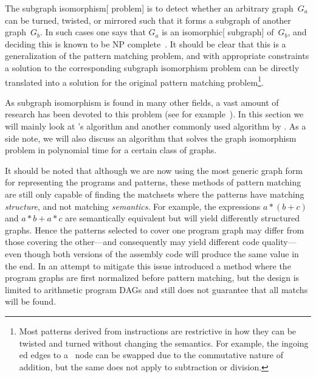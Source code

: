 The \gls{subgraph isomorphism}[ problem] is to detect whether an arbitrary
\gls{graph}~$G_a$ can be turned, twisted, or mirrored such that it forms a
\gls{subgraph} of another \gls{graph}~$G_b$.
%
In such cases one says that $G_a$
is an \gls{isomorphic}[ \gls{subgraph}] of~$G_b$, and deciding this is known to
be \gls{NP complete}~\cite{Cook1971}.
%
It should be clear that this is a
generalization of the \gls{pattern matching} problem, and with appropriate
constraints a solution to the corresponding \gls{subgraph isomorphism} problem
can be directly translated into a solution for the original \gls{pattern
  matching} problem\footnote{Most \glspl{pattern} derived from
  \glspl{instruction} are restrictive in how they can be twisted and turned
  without changing the semantics.
%
For example, the \gls{ingoing ed} \glspl{edge}
  to a \gT{$+$}~\gls{node} can be swapped due to the commutative nature of
  addition, but the same does not apply to subtraction or division.}.

As \gls{subgraph isomorphism} is found in many other fields, a vast amount of
research has been devoted to this problem (see for
example~).
%
In this section we
will mainly look at \citeauthor{Ullmann1976}'s algorithm and another commonly
used algorithm by \citeauthor{Cordella2001}.
%
As a side note, we will also
discuss an algorithm that solves the \gls{graph isomorphism} problem in
polynomial time for a certain class of \glspl{graph}.

It should be noted that although we are now using the most generic \gls{graph}
form for representing the \glspl{program} and \glspl{pattern}, these methods of
\gls{pattern matching} are still only capable of finding the \glspl{matchset}
where the \glspl{pattern} have matching \emph{structure}, and not matching
\emph{semantics}.
%
For example, the expressions \mbox{$a * (b + c)$} and \mbox{$a
  * b + a * c$} are semantically equivalent but will yield differently
structured \glspl{graph}.
%
Hence the \glspl{pattern} selected to cover one
\gls{program graph} may differ from those covering the other---and consequently
may yield different code quality---even though both versions of the
\gls{assembly code} will produce the same value in the end.
%
In an attempt to
mitigate this issue \textcite{Arora2010} introduced a method where the
\glspl{program graph} are first normalized before \gls{pattern matching}, but
the design is limited to arithmetic \glspl{program DAG} and still does not
guarantee that all \glspl{match} will be found.


